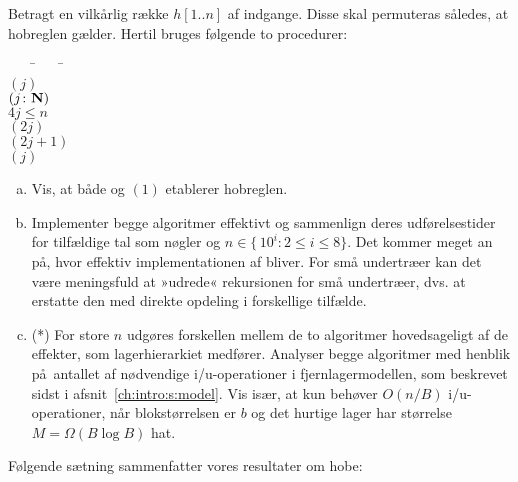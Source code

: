 \begin{exerc} \label{heapify}
Betragt en vilkårlig række $h[1..n]$ af indgange. 
Disse skal permuteras således, at hobreglen gælder.
Hertil bruges følgende to procedurer:
\begin{tabbing}
~~~~\=~~~~\=\kill
\Procedure {}\+\\
   $(j)$\-\\[2mm]
\Procedure {}$(j{\colon} \mathbf N)$\+\\
    \If $4j\leq n$ \Then\+\\
       $(2j)$\\
       $(2j+1)$\-\\
    $(j)$
\end{tabbing}

\begin{enumerate}[(a)]
\item Vis, at både  og $(1)$ etablerer hobreglen.
\item Implementer begge algoritmer effektivt og sammenlign deres udførelsestider for tilfældige tal  som nøgler og $n\in\{\,10^i\colon 2\leq i\leq 8\}$.
Det kommer meget an på, hvor effektiv implementationen af  bliver.
For små undertræer kan det være meningsfuld at »udrede« rekursionen for små undertræer, dvs. at erstatte den med direkte opdeling i forskellige tilfælde.
\item (*) For store $n$ udgøres forskellen mellem de to algoritmer hovedsageligt af de effekter, som lagerhierarkiet 
medfører.
Analyser begge algoritmer med henblik på antallet af nødvendige i/u-operationer i fjernlagermodellen, som beskrevet sidst i afsnit~\ref{ch:intro:s:model}. 
Vis især, at  kun behøver $O(n/B)$ i/u-operationer, når blokstørrelsen er $b$ og det hurtige lager har størrelse $M=\Omega(B\log B)$ hat. 
\end{enumerate}
\end{exerc}

Følgende sætning sammenfatter vores resultater om hobe:

